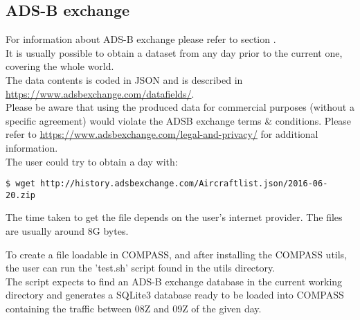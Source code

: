 \subsection{ADS-B exchange}

For information about ADS-B exchange please refer to section . \\

It is usually possible to obtain a dataset from any day prior to the current one, covering the whole world. \\

The data contents is coded in JSON and is described in \url{https://www.adsbexchange.com/datafields/}. \\

Please be aware that using the produced data for commercial purposes (without a specific agreement) would violate the ADSB exchange terms \& conditions. Please refer to \url{https://www.adsbexchange.com/legal-and-privacy/} for additional information.\\

The user could try to obtain a day with:
\begin{lstlisting}
$ wget http://history.adsbexchange.com/Aircraftlist.json/2016-06-20.zip
\end{lstlisting}

The time taken to get the file depends on the user's internet provider. The files are usually around 8G bytes.

To create a file loadable in COMPASS, and after installing the COMPASS utils, the user can run the 'test.sh' script found in the utils directory. \\

The script expects to find an ADS-B exchange database in the current working directory and generates a SQLite3 database ready to be loaded into COMPASS containing the traffic between 08Z and 09Z of the given day.
